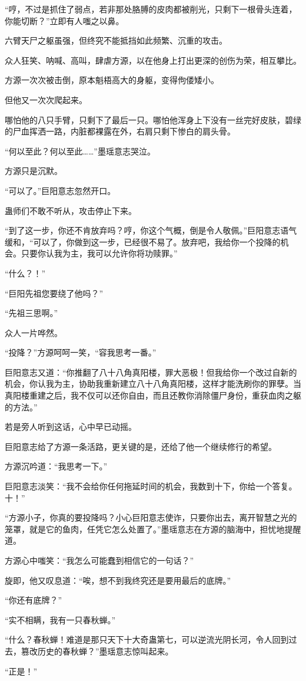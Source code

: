 \begin{this_body}
“哼，不过是抓住了弱点，若非那处胳膊的皮肉都被削光，只剩下一根骨头连着，你能切断？”立即有人嗤之以鼻。

六臂天尸之躯虽强，但终究不能抵挡如此频繁、沉重的攻击。

众人狂笑、呐喊、高叫，肆虐方源，以在他身上打出更深的创伤为荣，相互攀比。

方源一次次被击倒，原本魁梧高大的身躯，变得佝偻矮小。

但他又一次次爬起来。

哪怕他的八只手臂，只剩下了最后一只。哪怕他浑身上下没有一丝完好皮肤，碧绿的尸血挥洒一路，内脏都裸露在外，右肩只剩下惨白的肩头骨。

“何以至此？何以至此……”墨瑶意志哭泣。

方源只是沉默。

“可以了。”巨阳意志忽然开口。

蛊师们不敢不听从，攻击停止下来。

“到了这一步，你还不肯放弃吗？哼，你这个气概，倒是令人敬佩。”巨阳意志语气缓和，“可以了，你做到这一步，已经很不易了。放弃吧，我给你一个投降的机会。只要你认我为主，我可以允许你将功赎罪。”

“什么？！”

“巨阳先祖您要绕了他吗？”

“先祖三思啊。”

众人一片哗然。

“投降？”方源呵呵一笑，“容我思考一番。”

巨阳意志又道：“你推翻了八十八角真阳楼，罪大恶极！但我给你一个改过自新的机会，你认我为主，协助我重新建立八十八角真阳楼，这样才能洗刷你的罪孽。当真阳楼重建之后，我不仅可以还你自由，而且还教你消除僵尸身份，重获血肉之躯的方法。”

若是旁人听到这话，心中早已动摇。

巨阳意志给了方源一条活路，更关键的是，还给了他一个继续修行的希望。

方源沉吟道：“我思考一下。”

巨阳意志淡笑：“我不会给你任何拖延时间的机会，我数到十下，你给一个答复。十！”

“方源小子，你真的要投降吗？小心巨阳意志使诈，只要你出去，离开智慧之光的笼罩，就是它的鱼肉，任凭它怎么处置了。”墨瑶意志在方源的脑海中，担忧地提醒道。

方源心中嗤笑：“我怎么可能蠢到相信它的一句话？”

旋即，他又叹息道：“唉，想不到我终究还是要用最后的底牌。”

“你还有底牌？”

“实不相瞒，我有一只春秋蝉。”

“什么？春秋蝉！难道是那只天下十大奇蛊第七，可以逆流光阴长河，令人回到过去，篡改历史的春秋蝉？”墨瑶意志惊叫起来。

“正是！”

\end{this_body}

